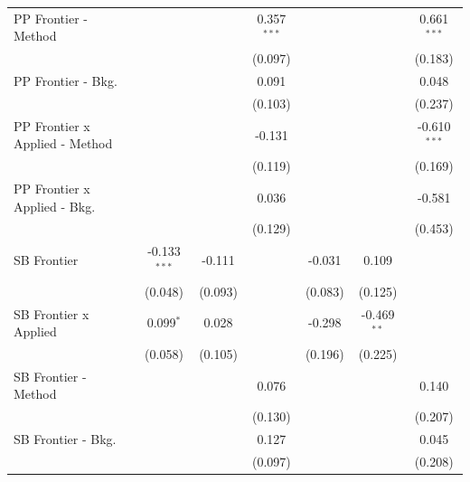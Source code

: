\begin{tabular}{lcccccc}
   PP Frontier - Method           &                &              & 0.357$^{***}$ &               &               & 0.661$^{***}$\\   
                                  &                &              & (0.097)       &               &               & (0.183)\\   
   PP Frontier - Bkg.             &                &              & 0.091         &               &               & 0.048\\   
                                  &                &              & (0.103)       &               &               & (0.237)\\   
   PP Frontier x Applied - Method &                &              & -0.131        &               &               & -0.610$^{***}$\\   
                                  &                &              & (0.119)       &               &               & (0.169)\\   
   PP Frontier x Applied - Bkg.   &                &              & 0.036         &               &               & -0.581\\   
                                  &                &              & (0.129)       &               &               & (0.453)\\   
   SB Frontier                    & -0.133$^{***}$ & -0.111       &               & -0.031        & 0.109         &   \\   
                                  & (0.048)        & (0.093)      &               & (0.083)       & (0.125)       &   \\   
   SB Frontier x Applied          & 0.099$^{*}$    & 0.028        &               & -0.298        & -0.469$^{**}$ &   \\   
                                  & (0.058)        & (0.105)      &               & (0.196)       & (0.225)       &   \\   
   SB Frontier - Method           &                &              & 0.076         &               &               & 0.140\\   
                                  &                &              & (0.130)       &               &               & (0.207)\\   
   SB Frontier - Bkg.             &                &              & 0.127         &               &               & 0.045\\   
                                  &                &              & (0.097)       &               &               & (0.208)\\   

\end{tabular}
